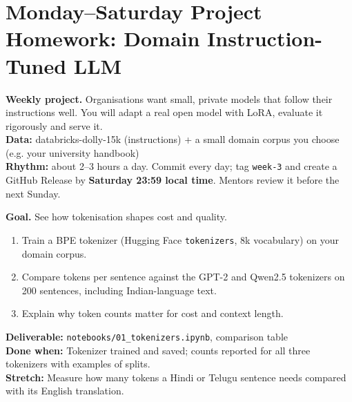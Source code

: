\clearpage
\section*{Monday--Saturday Project Homework: Domain Instruction-Tuned LLM}
\begin{tcolorbox}[enhanced,colback=navy,colframe=gold,boxrule=0.8pt,arc=3pt,coltext=white,left=8pt,right=8pt,top=6pt,bottom=6pt]
{\color{gold}\bfseries Weekly project.} Organisations want small, private models that follow their instructions well. You will adapt a real open model with LoRA, evaluate it rigorously and serve it.\\[3pt]
{\color{gold}\bfseries Data:} databricks-dolly-15k (instructions) + a small domain corpus you choose (e.g. your university handbook)\\[3pt]
{\color{gold}\bfseries Rhythm:} about 2--3 hours a day. Commit every day; tag \texttt{week-3} and create a GitHub Release by \textbf{Saturday 23:59 local time}. Mentors review it before the next Sunday.
\end{tcolorbox}

\begin{tcolorbox}[enhanced,breakable,colback=white,colframe=sun,boxrule=0.8pt,arc=2pt,left=7pt,right=7pt,top=4pt,bottom=4pt,
  title={\bfseries Monday --- Tokenisers in practice\hfill\normalfont\small 2 h},coltitle=white,colbacktitle=sun,fonttitle=\small]
\textbf{Goal.} See how tokenisation shapes cost and quality.
\begin{enumerate}[itemsep=1pt,topsep=2pt]
  \item Train a BPE tokenizer (Hugging Face \texttt{tokenizers}, 8k vocabulary) on your domain corpus.
  \item Compare tokens per sentence against the GPT-2 and Qwen2.5 tokenizers on 200 sentences, including Indian-language text.
  \item Explain why token counts matter for cost and context length.
\end{enumerate}
\textbf{\color{dataC}Deliverable:} \texttt{notebooks/01\_tokenizers.ipynb}, comparison table\\
\textbf{\color{navy}Done when:} Tokenizer trained and saved; counts reported for all three tokenizers with examples of splits.\\
\textbf{\color{skillC}Stretch:} Measure how many tokens a Hindi or Telugu sentence needs compared with its English translation.
\end{tcolorbox}

